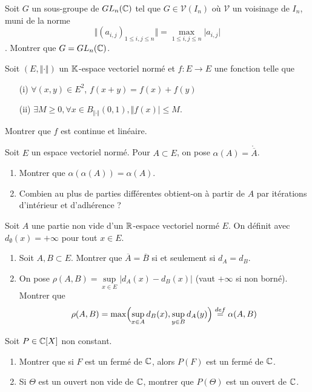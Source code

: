 \begin{exercise}
	Soit $G$ un sous-groupe de $GL_{n}(\mathbb{C})$ tel que $G\in\mathcal{V}(I_{n})$ où $\mathcal{V}$ un voisinage de $I_{n}$, muni de la norme 
	$$\Vert (a_{i,j})_{1\leqslant i,j\leqslant n}\Vert=\max\limits_{1\leqslant i,j\leqslant n}\vert a_{i,j}\vert$$. Montrer que $G=GL_{n}(\mathbb{C})$.
\end{exercise}

\begin{exercise}
	Soit $(E,\Vert\cdot\Vert)$ un $\mathbb{K}$-espace vectoriel normé et $f:E\to E$ une fonction telle que 
	\begin{enumerate}
		\item [(i)] $\forall(x,y)\in E^{2}$, $f(x+y)=f(x)+f(y)$
		\item [(ii)] $\exists M\geqslant0,\forall x\in B_{\Vert\cdot\Vert}(0,1),\Vert f(x)\vert\leqslant M$.
	\end{enumerate}
	Montrer que $f$ est continue et linéaire.
\end{exercise}

\begin{exercise}
	Soit $E$ un espace vectoriel normé. Pour $A\subset E$, on pose $\alpha(A)=\mathring{\overline{A}}$.
	\begin{enumerate}
		\item Montrer que $\alpha(\alpha(A))=\alpha(A)$.
		\item Combien au plus de parties différentes obtient-on à partir de $A$ par itérations d'intérieur et d'adhérence ?
	\end{enumerate}
\end{exercise}

\begin{exercise}
	Soit $A$ une partie non vide d'un $\mathbb{R}$-espace vectoriel normé $E$. On définit  avec $d_{\emptyset}(x)=+\infty$ pour tout $x\in E$.
	\begin{enumerate}
		\item Soit $A,B\subset E$. Montrer que $\overline{A}=\overline{B}$ si et seulement si $d_{A}=d_{B}$.
		\item On pose $\rho(A,B)=\sup\limits_{x\in E}\vert d_{A}(x)-d_{B}(x)\vert$ (vaut $+\infty$ si non borné). Montrer que 
		$$\rho(A,B)=\max\Bigl(\sup\limits_{x\in A}d_{B}(x),\sup\limits_{y\in B}d_{A}(y)\Bigr)\overset{def}{=}\alpha(A,B)$$
	\end{enumerate}
\end{exercise}

\begin{exercise}
	Soit $P\in\mathbb{C}[X]$ non constant.
	\begin{enumerate}
		\item Montrer que si $F$ est un fermé de $\mathbb{C}$, alors $P(F)$ est un fermé de $\mathbb{C}$.
		\item Si $\Theta$ est un ouvert non vide de $\mathbb{C}$, montrer que $P(\Theta)$ est un ouvert de $\mathbb{C}$.
	\end{enumerate}
\end{exercise}

